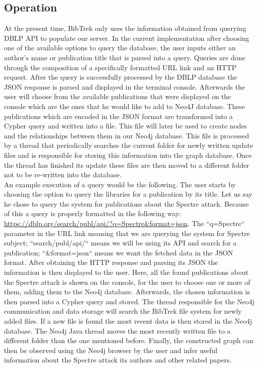 \documentclass[twocolumn]{article}
\begin{document}
\subsection{Operation}
At the present time, BibTrek only uses the information obtained from querying DBLP API to populate our server. In the current implementation after choosing one of the available options to query the database, the user inputs either an author's name or publication title that is  parsed into a query. Queries are done through the composition of a specifically formatted URL link and an HTTP request. After the query is successfully processed by the DBLP database the JSON response is parsed and displayed in the terminal console. Afterwards the user will choose from the available publications that were displayed on the console which are the ones that he would like to add to Neo4J database. These publications which are encoded in the JSON format are transformed into a Cypher query and written into a file. This file will later be used to create nodes and the relationships between them in our Neo4j database. This file is processed by a thread that periodically searches the current folder for newly written update files and is responsible for storing this information into the graph database. Once the thread has finished its update these files are then moved to a different folder not to be re-written into the database. \\[1\baselineskip]
An example execution of a query would be the following. The user starts by choosing the option to query the libraries for a publication by its title. Let us say he chose to query the system for publications about the Spectre attack. Because of this a query is properly formatted in the following way: \url{https://dblp.org/search/publ/api/?q=Spectre&format=json}. The ``q=Spectre`` parameter in the URL link meaning that we are querying the system for Spectre subject; ``search/publ/api/`` means we will be using its API and search for a publication; ``&format=json`` means we want the fetched data in the JSON format. After obtaining the HTTP response and parsing its JSON the information is then displayed to the user. Here, all the found publications about the Spectre attack is shown on the console, for the user to choose one or more of them, adding them to the Neo4j database. Afterwards, the chosen information is then parsed into a Cypher query and stored. The thread responsible for the Neo4j communication and data storage will search the BibTrek file system for newly added files. If a new file is found the most recent data is then stored in the Neo4j database. The Neo4j Java thread moves the most recently written file to a different folder than the one mentioned before. Finally, the constructed graph can then be observed using the Neo4j browser by the user and infer useful information about the Spectre attack its authors and other related papers.
\end{document}
